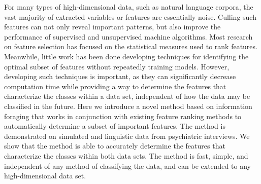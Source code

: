 For many types of high-dimensional data, such as natural language corpora, the vast majority of extracted variables or features are essentially noise. Culling such features can not only reveal important patterns, but also improve the performance of supervised and unsupervised machine algorithms. Most research on feature selection has focused on the statistical measures used to rank features.  Meanwhile, little work has been done developing techniques for identifying the optimal subset of features without repeatedly training models. However, developing such techniques is important, as they can significantly decrease computation time while providing a way to determine the features that characterize the classes within a data set, independent of how the data may be classified in the future.  Here we introduce a novel method based on information foraging that works in conjunction with existing feature ranking methods to automatically determine a subset of important features.  The method is demonstrated on simulated and linguistic data from psychiatric interviews. We show that the method is able to accurately determine the features that characterize the classes within both data sets.  The method is fast, simple, and independent of any method of classifying the data, and can be extended to any high-dimensional data set.
